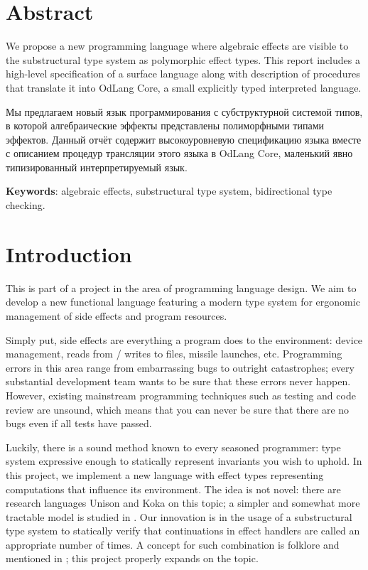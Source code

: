 \documentclass[a4paper,14pt]{extreport}
\begin{document}
\tableofcontents

\chapter*{Abstract}

We propose a new programming language where algebraic effects are visible to the
substructural type system as polymorphic effect types. This report includes a
high-level specification of a surface language along with description of
procedures that translate it into OdLang Core, a small explicitly typed
interpreted language.

Мы предлагаем новый язык программирования с субструктурной систе\-мой типов, в
которой алгебраические эффекты представлены полиморфны\-ми типами эффектов.
Данный отчёт содержит высокоуровневую специфи\-кацию языка вместе с описанием
процедур трансляции этого языка в OdLang Core, маленький явно типизированный
интерпретируемый язык.

\textbf{Keywords}: algebraic effects, substructural type system, bidirectional
type checking.

\chapter{Introduction}

This is part of a project in the area of programming language design. We aim to
develop a new functional language featuring a modern type system for ergonomic
management of side effects and program resources.

Simply put, side effects are everything a program does to the environment:
device management, reads from / writes to files, missile launches, etc.
Programming errors in this area range from embarrassing bugs to outright
catastrophes; every substantial development team wants to be sure that these
errors never happen. However, existing mainstream programming techniques such as
testing and code review are unsound, which means that you can never be sure that
there are no bugs even if all tests have passed.

Luckily, there is a sound method known to every seasoned programmer: type system
expressive enough to statically represent invariants you wish to uphold. In this
project, we implement a new language with effect types representing computations
that influence its environment. The idea is not novel: there are research
languages Unison \cite{unison} and Koka \cite{koka} on this topic; a simpler and
somewhat more tractable model is studied in \cite{bauer}. Our innovation is in
the usage of a substructural type system to statically verify that continuations
in effect handlers are called an appropriate number of times. A concept for such
combination is folklore and mentioned in \cite{folklore}; this project properly
expands on the topic.
\end{document}
